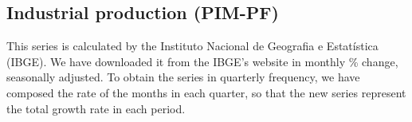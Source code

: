 \subsection{Industrial production (PIM-PF)}
This series is calculated by the Instituto Nacional de Geografia e Estatística (IBGE). We have downloaded it from the IBGE's website in monthly \% change, seasonally adjusted. To obtain the series in quarterly frequency, we have composed the rate of the months in each quarter, so that the new series represent the total growth rate in each period.